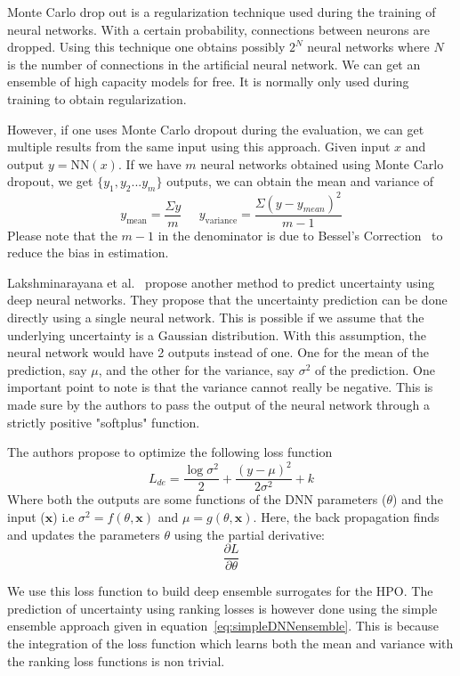 \documentclass[12pt, twoside, ngerman]{report}
\begin{document}
Monte Carlo drop out is a regularization technique used during the training of neural networks.
With a certain probability,  connections between neurons are dropped.
Using this technique one obtains possibly $2^N$ neural networks where $N$ is the number of connections
in the artificial neural network.
We can get an ensemble of high capacity models for free.
It is normally only used during training to obtain regularization.

However,  if one uses Monte Carlo dropout during the evaluation,  we can get multiple results from the same input using this approach.
Given input $x$ and output $y = \textrm{NN}(x)$.  If we have $m$ neural networks obtained using Monte Carlo dropout,  we get $\{y_1, y_2... y_m\}$ outputs,  we can obtain the mean and variance of 
\begin{equation}\label{eq:simpleDNNensemble}
y_\textrm{mean} = \frac{\Sigma y}{m}  \;\;\;\;\;  y_\textrm{variance} =\frac{\Sigma(y - y_{mean})^2}{m-1}
\end{equation}
Please note that the $m-1$ in the denominator is due to Bessel’s Correction~\cite{besselcorrection} to reduce the bias in estimation.


Lakshminarayana et al.~\cite{DeepEnsemblePaper} propose another method to predict uncertainty using deep neural networks.
They propose that the uncertainty prediction can be done directly using a single neural network.
This is possible if we assume that the underlying uncertainty is a Gaussian distribution.
With this assumption, the neural network would have 2 outputs instead of one.
One for the mean of the prediction, say $\mu$, and the other for the variance,  say $\sigma^2$
 of the prediction.
One important point to note is that the variance cannot really be negative.
This is made sure by the authors to pass the output of the neural network through a strictly positive "softplus" function.
 
The authors propose to optimize the following loss function
$$
L_{de} = \frac{\log \sigma^2 }{2} + \frac{(y - \mu)^2}{2\sigma^2} + k
$$
Where both the outputs are some functions of the DNN parameters ($\theta$) and the input ($\textbf{x}$) i.e $\sigma^2 = f(\theta,  \textbf{x})$ and $\mu = g(\theta, \textbf{x})$.
Here, the back propagation finds and updates the parameters $\theta$ using the partial derivative:
$$
\frac{\partial L}{\partial \theta}
$$


We use this loss function to build deep ensemble surrogates for the HPO.
The prediction of uncertainty using ranking losses is however done using the simple ensemble approach given in equation~\ref{eq:simpleDNNensemble}.
This is because the integration of the loss function which learns both the mean and variance with the ranking loss functions is non trivial.
\end{document}
